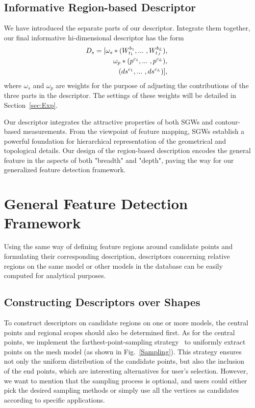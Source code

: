 \subsection{Informative Region-based Descriptor}

We have introduced the separate parts of our descriptor.
Integrate them together, our final informative hi-dimensional
descriptor has the form
\begin{equation}
\label{eq:desFinal}
\begin{aligned}
  \hspace{-0.5mm}
  D_s =  [\omega_s*(W_{t_1}^{b_1},...\ ,W_{t_J}^{b_L}),\\
  \omega_p*(p^{c_1},...\ ,p^{c_L}),\\
  (ds^{c_1},...\ ,ds^{c_L})],
\end{aligned}
\end{equation}
where $\omega_s$ and $\omega_p$ are weights for the purpose of adjusting
the contributions of the three parts in the descriptor. The settings
of these weights will be detailed in Section~\ref{sec:Exp}.

Our descriptor integrates the attractive properties of both SGWs and
contour-based measurements. From the viewpoint of
feature mapping, SGWs establish a powerful foundation for
hierarchical representation of the geometrical and topological
details. Our design of the region-based description encodes the
general feature in the aspects of both "breadth" and "depth", paving
the way for our generalized feature detection framework.


\section{General Feature Detection Framework}
\label{sec:Framework}

Using the same way of defining feature regions around
candidate points and formulating their corresponding description,
descriptors concerning relative regions on the same model or other
models in the database can be easily computed for analytical
purposes.

\subsection{Constructing Descriptors over Shapes}

To construct descriptors on candidate regions on one or more models,
the central points and regional scopes should also be determined
first. As for the central points, we implement the
farthest-point-sampling strategy~\cite{Moenning:2003} to uniformly
extract points on the mesh model (as shown in Fig.~\ref{Sampling}).
This strategy ensures not only the uniform
distribution of the candidate points, but also the inclusion of the
end points, which are interesting alternatives for user's selection.
However, we want to mention that the sampling process is optional,
and users could either pick the desired sampling methods or simply
use all the vertices as candidates according to specific
applications.

